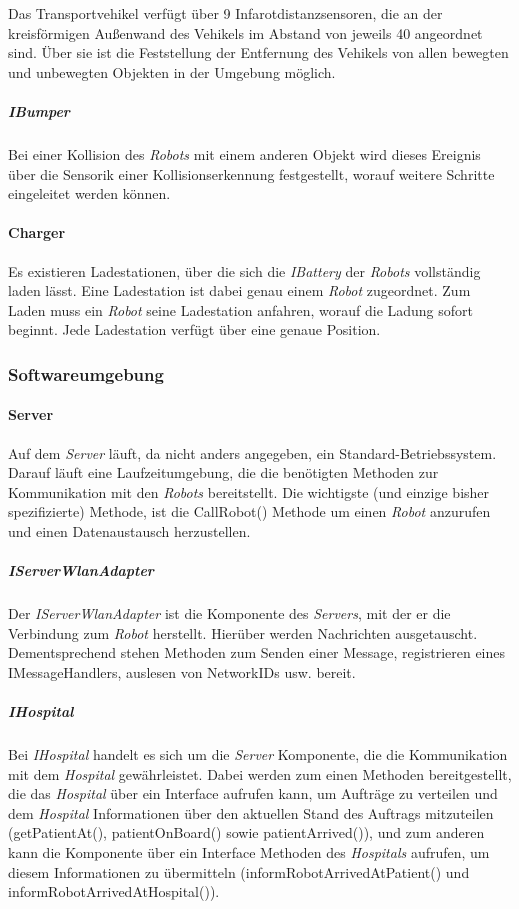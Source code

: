     Das Transportvehikel verfügt über 9 Infarotdistanzsensoren, die an der
    kreisförmigen Außenwand des Vehikels im Abstand von jeweils 40
    angeordnet sind. Über sie ist die Feststellung der Entfernung des
    Vehikels von allen bewegten und unbewegten Objekten in der Umgebung
    möglich.

    \subparagraph{IBumper}\label{ibumper}

    Bei einer Kollision des \emph{Robots} mit einem anderen Objekt wird
    dieses Ereignis über die Sensorik einer Kollisionserkennung festgestellt, worauf
    weitere Schritte eingeleitet werden können.

    \paragraph{Charger}\label{charger}

    Es existieren Ladestationen, über die sich die \emph{IBattery} der
    \emph{Robots} vollständig laden lässt. Eine Ladestation ist dabei genau
    einem \emph{Robot} zugeordnet. Zum Laden muss ein \emph{Robot} seine
    Ladestation anfahren, worauf die Ladung sofort beginnt. Jede Ladestation
    verfügt über eine genaue Position.

    \subsubsection{Softwareumgebung}

    \paragraph{Server}\label{server}
    		Auf dem \emph{Server} läuft, da nicht anders angegeben, ein Standard-Betriebssystem. Darauf läuft eine Laufzeitumgebung, die die benötigten Methoden zur Kommunikation mit den \emph{Robots} bereitstellt. Die wichtigste (und einzige bisher spezifizierte) Methode, ist die CallRobot() Methode um einen \emph{Robot} anzurufen und einen Datenaustausch herzustellen.
    	\subparagraph{IServerWlanAdapter}\label{iserverwlanadapter}
    		Der \emph{IServerWlanAdapter} ist die Komponente des \emph{Servers}, mit der er die Verbindung zum \emph{Robot} herstellt. Hierüber werden Nachrichten ausgetauscht. Dementsprechend stehen Methoden zum Senden einer Message, registrieren eines IMessageHandlers, auslesen von NetworkIDs usw. bereit.
    	\subparagraph{IHospital}\label{ihospital}
    		Bei \emph{IHospital} handelt es sich um die \emph{Server} Komponente, die die Kommunikation mit dem \emph{Hospital} gewährleistet. Dabei werden zum einen Methoden bereitgestellt, die das \emph{Hospital} über ein Interface aufrufen kann, um Aufträge zu verteilen und dem \emph{Hospital} Informationen über den aktuellen Stand des Auftrags mitzuteilen (getPatientAt(), patientOnBoard() sowie patientArrived()), und zum anderen kann die Komponente über ein Interface Methoden des \emph{Hospitals} aufrufen, um diesem Informationen zu übermitteln (informRobotArrivedAtPatient() und informRobotArrivedAtHospital()).
